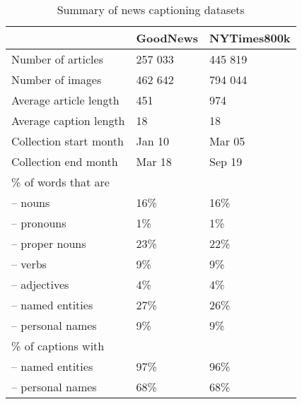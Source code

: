 


\begin{table}[t]
	\caption {Summary of news captioning datasets}
	\label{tab:datasets}
	\centering
	\begin{tabularx}{\linewidth}{lXX}
		\toprule
		  & GoodNews  &   NYTimes800k \\
		\midrule
      Number of articles & 257 033 & 445 819 \\
      Number of images   & 462 642 & 794 044 \\
      Average article length & 451 & 974 \\
      Average caption length & 18 & 18 \\
      Collection start month & Jan 10 & Mar 05\\
      Collection end month & Mar 18 & Sep 19 \\
      \midrule
      \% of words that are \\
      \quad -- nouns & 16\% & 16\% \\
      \quad -- pronouns & 1\% & 1\% \\
      \quad -- proper nouns & 23\% & 22\% \\
      \quad -- verbs & 9\% & 9\%  \\
      \quad -- adjectives & 4\% & 4\% \\
      \quad -- named entities & 27\% & 26\% \\
      \quad -- personal names & 9\% & 9\% \\
      \midrule
      \% of captions with \\
      \quad -- named entities & 97\% & 96\% \\
      \quad -- personal names & 68\% & 68\% \\
		\bottomrule
	\end{tabularx}
\end{table}

